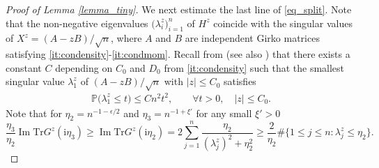\documentclass[10pt,reqno]{amsart}
\renewcommand{\Im}{\operatorname{Im}}
\newcommand{\ii}{\mathrm{i}}
\newcommand{\<}{\langle}
\renewcommand{\>}{\rangle}
\numberwithin{equation}{section}
\begin{document}
\begin{proof}[Proof of Lemma \ref{lemma_tiny}]
	
	We next estimate the last line of \eqref{eq_split}. Note that the non-negative eigenvalues $\big(\lambda^{z}_{ i}\big)_{i=1}^n$ of $H^{z}$ coincide with the singular values of $X^z=(A-zB)/\sqrt{n}$, where $A$ and $B$ are independent Girko matrices satisfying \ref{it:condensity}-\ref{it:condmom}. 
     Recall from \cite[Lemma 3.4]{Davies} (see also \cite{invert,wegner}) 
    that there exists a constant $C$ depending on $C_0$ and $D_0$ from \ref{it:condensity} such that the smallest singular value $\lambda_1^z$ of $(A-zB)/\sqrt{n}$ with $|z|\leq C_0$ satisfies
	\begin{align}\label{eq:tail_estimate}
		\mathbb{P} \big(\lambda^z_1 \leq t \big) \leq C n^2 t^2, \qquad \forall t>0,\quad |z|\leq C_0.
	\end{align}
 Note that for $\eta_2=n^{-1-\epsilon/2}$ and $\eta_3=n^{-1+\xi'}$ for any small $\xi'>0$
	$$ \frac{\eta_3}{\eta_2} \Im\mathrm{Tr}G^{z}(\ii \eta_3) \geq \Im\mathrm{Tr}G^{z}(\ii \eta_2)=2\sum_{j=1}^{n} \frac{\eta_2}{(\lambda^z_j)^2+\eta_2^2}  \geq \frac{2}{\eta_2} \# \big\{ 1\leq j\leq n: \lambda_j^z \leq \eta_2 \big\}.$$

\end{proof}
\end{document}
